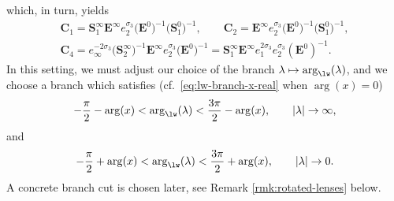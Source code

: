 \begin{Remark}
\begin{equation}
 \label{eq:general-connection-factorization-1}
 \end{equation}
 which, in turn, yields
 \begin{gather}
 \mathbf{C}_1 = \mathbf S_1^\infty \mathbf{E}^\infty e_2^{\sigma_3} \big(\mathbf{E}^0\big)^{-1} \big(\mathbf S_1^0\big)^{-1}, \qquad
 \mathbf{C}_2 = \mathbf{E}^\infty e_2^{\sigma_3} \big(\mathbf{E}^0\big)^{-1} \big(\mathbf S_1^0\big)^{-1},\nonumber \\
 \mathbf{C}_4 = e_\infty^{-2\sigma_3}\big(\mathbf{S}_2^\infty\big)^{-1}\mathbf{E}^\infty e_2^{\sigma_3} \big(\mathbf{E}^0\big)^{-1} = \mathbf S_1^\infty \mathbf E^\infty e_1^{2\sigma_3} e_2^{\sigma_3} (\mathbf{E}^0)^{-1}.
 \label{eq:general-connection-factorization-2}
 \end{gather}
 In this setting, we must adjust our choice of the branch $\lambda\mapsto \mathrm{arg}_{\lw}(\lambda)$, and we choose a branch which satisfies (cf.\ \eqref{eq:lw-branch-x-real} when $\arg(x) = 0$)
 \begin{equation*} %
 -\dfrac{\pi}{2} - \arg(x) < \mathrm{arg}_{\lw} (\lambda) < \dfrac{3\pi}{2} - \arg(x), \qquad |\lambda| \to \infty,
 \end{equation*}
 and
 \begin{equation*} %
 -\dfrac{\pi}{2} + \arg(x) < \mathrm{arg}_{\lw} (\lambda) < \dfrac{3\pi}{2} + \arg(x), \qquad |\lambda| \to 0.
 \end{equation*}
 A concrete branch cut is chosen later, see Remark \ref{rmk:rotated-lenses} below.
\end{Remark}

